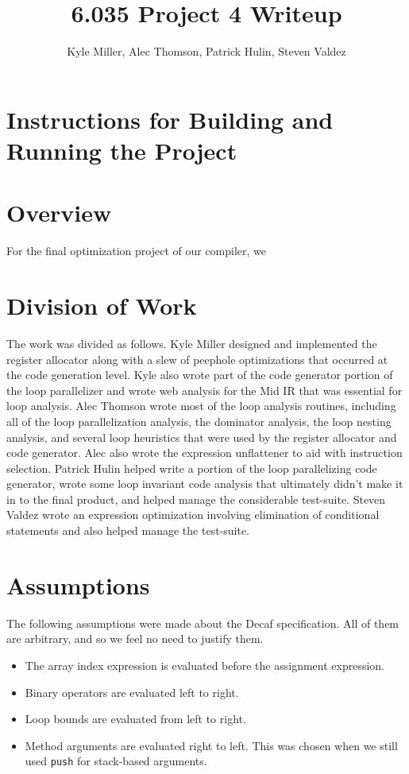 \documentclass[11pt]{article}
\title{6.035 Project 4 Writeup}
\author{Kyle Miller, Alec Thomson, Patrick Hulin, Steven Valdez}
\begin{document}
\maketitle

\section {Instructions for Building and Running the Project}

\section {Overview}

For the final optimization project of our compiler, we 

\section {Division of Work}

The work was divided as follows. Kyle Miller designed and implemented
the register allocator along with a slew of peephole optimizations
that occurred at the code generation level. Kyle also wrote part of
the code generator portion of the loop parallelizer and wrote web
analysis for the Mid IR that was essential for loop analysis. Alec Thomson wrote most of
the loop analysis routines, including all of the loop parallelization
analysis, the dominator analysis, the loop nesting analysis, and
several loop heuristics that were used by the register allocator and
code generator. Alec
also wrote the expression unflattener to aid with instruction
selection. Patrick Hulin helped write a portion of the loop
parallelizing code generator, wrote some loop invariant code analysis
that ultimately didn't make it in to the final product, and helped
manage the considerable test-suite. Steven Valdez wrote an expression
optimization involving elimination of conditional statements and also
helped manage the test-suite. 

\section{Assumptions}

The following assumptions were made about the Decaf specification.
All of them are arbitrary, and so we feel no need to justify them.
\begin{itemize}
\item The array index expression is evaluated before the assignment
  expression.
\item Binary operators are evaluated left to right.
\item Loop bounds are evaluated from left to right.
\item Method arguments are evaluated right to left.  This was chosen
  when we still used \texttt{push} for stack-based arguments.
\end{itemize}
\end{document}
